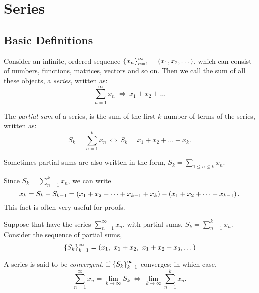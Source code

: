 \documentclass[12pt]{article}
\theoremstyle{definition}
\newcommand{\xn}{\set{x_{n}}_{n = 1}^{\infty}}
\newcommand{\ds}{\displaystyle}
\begin{document}
    \section{Series}
        \subsection{Basic Definitions}
            \begin{definition}[Series]
                Consider an infinite, ordered sequence $\xn = (x_{1}, x_{2}, \dots)$, which can consist of numbers, functions, matrices, vectors and so on. Then we call the sum of all these objects, a \textit{series}, written as: 
                \begin{equation*}
                    \sum_{n = 1}^{\infty}x_{n} ~ \Longleftrightarrow ~ x_{1} + x_{2} + \dots
                \end{equation*}
            \end{definition}
            \begin{definition}
                The \textit{partial sum} of a series, is the sum of the first $k$-number of terms of the series, written as:
                \begin{equation*}
                    S_{k} = \sum_{n = 1}^{k}x_{n} ~ \Longleftrightarrow ~ S_{k} = x_{1} + x_{2} + \dots + x_{k}.
                \end{equation*}
            \end{definition}
            \begin{note}
                Sometimes partial sums are also written in the form, $S_{k} = \ds\sum_{1 \leq n \leq k}x_{n}$.
            \end{note}
            \begin{remark}
                Since $S_{k} = \sum_{n = 1}^{k}x_{n}$, we can write
                \begin{equation*}
                    x_{k} = S_{k} - S_{k - 1} = \left(x_{1} + x_{2} + \dots + x_{k - 1} + x_{k}\right) - \left(x_{1} + x_{2} + \dots + x_{k - 1}\right).
                \end{equation*}
                This fact is often very useful for proofs.
            \end{remark}
            \begin{definition}
                Suppose that have the series $\sum_{n = 1}^{\infty}x_{n}$, with partial sums, $S_{k} = \sum_{n = 1}^{k}x_{n}$. Consider the sequence of partial sums, 
                \begin{equation*}
                    \left\{S_{k}\right\}_{k = 1}^{\infty} = (x_{1}, ~x_{1} + x_{2}, ~x_{1} + x_{2} + x_{3}, \dots)
                \end{equation*}

                A series is said to be \emph{convergent}, if $\left\{S_{k}\right\}_{k = 1}^{\infty}$ converges; in which case,
                \begin{equation*}
                    \sum_{n = 1}^{\infty}x_{n} = \lim_{k \rightarrow \infty}S_{k} ~ \Longleftrightarrow ~ \lim_{k \rightarrow \infty}\sum_{n = 1}^{k}x_{n}.
                \end{equation*}
            \end{definition}
\end{document}
